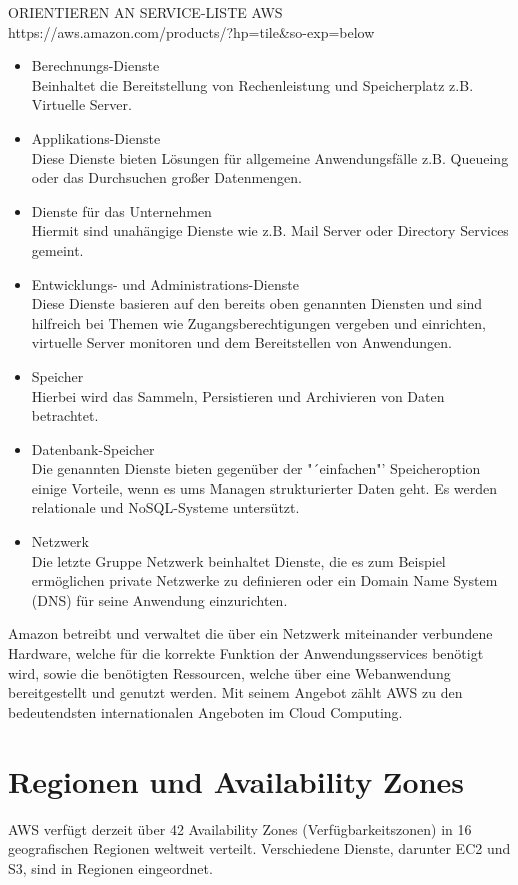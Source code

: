 {ORIENTIEREN AN SERVICE-LISTE AWS
https://aws.amazon.com/products/?hp=tile&so-exp=below

\begin{itemize}
  \item Berechnungs-Dienste
  \\ Beinhaltet die Bereitstellung von Rechenleistung und Speicherplatz z.B. Virtuelle Server.
  \item Applikations-Dienste
  \\ Diese Dienste bieten Lösungen für allgemeine Anwendungsfälle z.B. Queueing oder das Durchsuchen großer Datenmengen.
  \item Dienste für das Unternehmen
  \\ Hiermit sind unahängige Dienste wie z.B. Mail Server oder Directory Services gemeint.
  \item Entwicklungs- und Administrations-Dienste
  \\ Diese Dienste basieren auf den bereits oben genannten Diensten und sind hilfreich bei Themen wie Zugangsberechtigungen vergeben und einrichten, virtuelle Server monitoren und dem Bereitstellen von Anwendungen.
  \item Speicher
  \\ Hierbei wird das Sammeln, Persistieren und Archivieren von Daten betrachtet.
  \item Datenbank-Speicher
  \\ Die genannten Dienste bieten gegenüber der "´einfachen"' Speicheroption einige Vorteile, wenn es ums Managen strukturierter Daten geht. Es werden relationale und NoSQL-Systeme untersützt.
  \item Netzwerk
  \\ Die letzte Gruppe Netzwerk beinhaltet Dienste, die es zum Beispiel ermöglichen private Netzwerke zu definieren oder ein Domain Name System (DNS) für seine Anwendung einzurichten.
\end{itemize} \cite{wittig:awsinaction}

Amazon betreibt und verwaltet
die über ein Netzwerk miteinander verbundene Hardware, welche für die korrekte
Funktion der Anwendungsservices benötigt wird, sowie die benötigten Ressourcen,
welche über eine Webanwendung bereitgestellt und genutzt werden. Mit seinem Angebot
zählt AWS zu den bedeutendsten internationalen Angeboten im Cloud Computing.


\section{Regionen und Availability Zones}
\label{sec:regions}
AWS verfügt derzeit über 42 Availability Zones (Verfügbarkeitszonen) in 16 geografischen Regionen weltweit verteilt. Verschiedene Dienste, darunter EC2 und S3, sind in Regionen eingeordnet.

}
